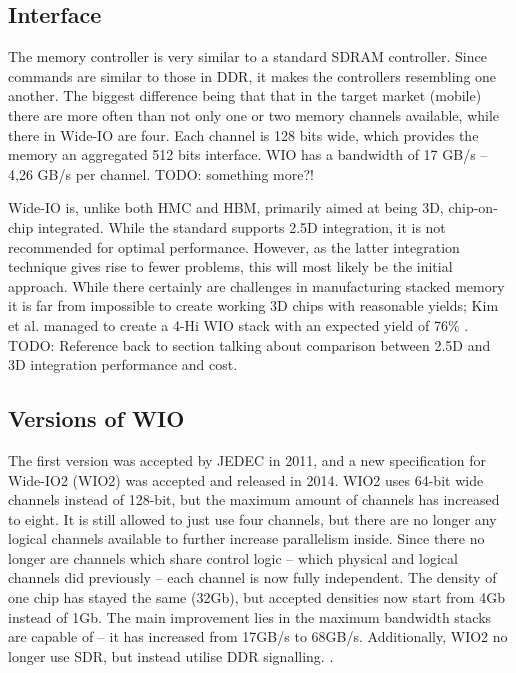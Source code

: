 \subsection{Interface}
The memory controller is very similar to a standard SDRAM controller. Since commands are similar to those in DDR, it makes the controllers resembling one another. The biggest difference being that that in the target market (mobile) there are more often than not only one or two memory channels available, while there in Wide-IO are four. Each channel is 128 bits wide, which provides the memory an aggregated 512 bits interface. WIO has a bandwidth of 17 GB/s -- 4,26 GB/s per channel. TODO: something more?!
\bigskip

Wide-IO is, unlike both HMC and HBM, primarily aimed at being 3D, chip-on-chip integrated. While the standard supports 2.5D integration, it is not recommended for optimal performance. However, as the latter integration technique gives rise to fewer problems, this will most likely be the initial approach. While there certainly are challenges in manufacturing stacked memory it is far from impossible to create working 3D chips with reasonable yields; Kim et al. managed to create a 4-Hi WIO stack with an expected yield of 76\% \cite{kim20121}. TODO: Reference back to section talking about comparison between 2.5D and 3D integration performance and cost.

\subsection{Versions of WIO}
The first version was accepted by JEDEC in 2011, and a new specification for Wide-IO2 (WIO2) was accepted and released in 2014. WIO2 uses 64-bit wide channels instead of 128-bit, but the maximum amount of channels has increased to eight. It is still allowed to just use four channels, but there are no longer any logical channels available to further increase parallelism inside. Since there no longer are channels which share control logic -- which physical and logical channels did previously -- each channel is now fully independent. The density of one chip has stayed the same (32Gb), but accepted densities now start from 4Gb instead of 1Gb. The main improvement lies in the maximum bandwidth stacks are capable of -- it has increased from 17GB/s to 68GB/s. Additionally, WIO2 no longer use SDR, but instead utilise DDR signalling. \cite{standard2014wide}.

